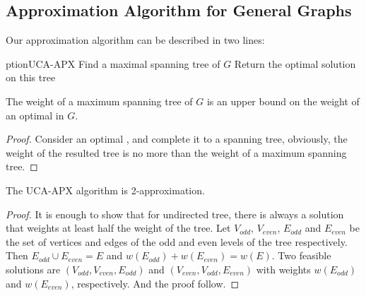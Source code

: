 
\subsection{Approximation Algorithm for General Graphs}
 Our approximation algorithm can be described in two lines:

\begin{algorithm}
\ca{}ption{UCA-APX}
Find a maximal spanning tree of $G$			\;
Return the optimal solution on this tree	\;
\end{algorithm}

\begin{lemma}
The weight of a maximum spanning tree of $G$ is an upper bound on the weight of
an optimal \uca{} in $G$.
\end{lemma}

\begin{proof}
Consider an optimal \uca{}, and complete it to a spanning tree, obviously, the
weight of the resulted tree is no more than the weight of a maximum spanning
tree.
\end{proof}

\begin{theorem}
The UCA-APX algorithm is 2-approximation.
\end{theorem}

\begin{proof}
It is enough to show that for undirected tree, there is always a solution that
weights at least half the weight of the tree.
Let $V_{odd}$, $V_{even}$, $E_{odd}$ and  $E_{even}$
be the set of vertices and edges of the odd and even levels of the tree
respectively.
Then $E_{odd} \cup E_{even} = E$ and $w(E_{odd}) + w(E_{even}) = w(E)$.
Two feasible solutions are $(V_{odd}, V_{even}, E_{odd})$ and 
$(V_{even}, V_{odd}, E_{even})$ with weights $w(E_{odd})$ and $w(E_{even})$,
respectively.
And the proof follow.
\end{proof}
 
